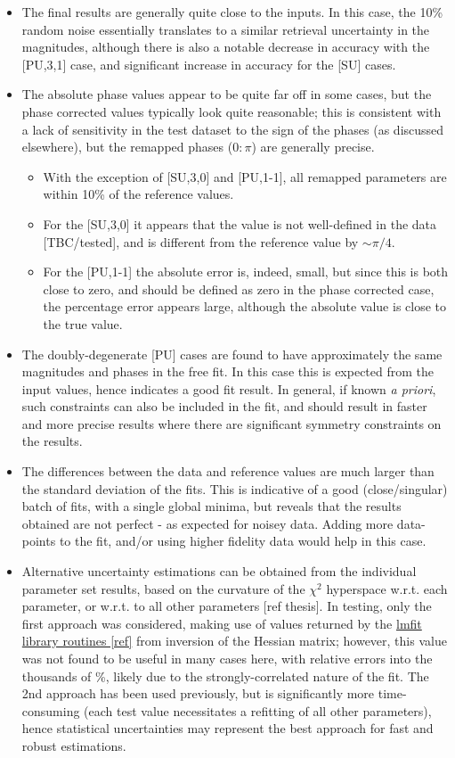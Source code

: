 \begin{itemize}
\item The final results are generally quite close to the inputs. In this case, the 10\% random noise essentially translates to a similar retrieval uncertainty in the magnitudes, although there is also a notable decrease in accuracy with the [PU,3,1] case, and significant increase in accuracy for the [SU] cases.
\item The absolute phase values appear to be quite far off in some cases, but the phase corrected values typically look quite reasonable; this is consistent with a lack of sensitivity in the test dataset to the sign of the phases (as discussed elsewhere), but the remapped phases ($0:\pi$) are generally precise. 
\begin{itemize}
\item With the exception of [SU,3,0] and [PU,1-1], all remapped parameters are within 10\% of the reference values.
\item For the [SU,3,0] it appears that the value is not well-defined in the data [TBC/tested], and is different from the reference value by $\sim\pi/4$.
\item For the [PU,1-1] the absolute error is, indeed, small, but since this is both close to zero, and should be defined as zero in the phase corrected case, the percentage error appears large, although the absolute value is close to the true value.
\end{itemize}
\item The doubly-degenerate [PU] cases are found to have approximately the same magnitudes and phases in the free fit. In this case this is expected from the input values, hence indicates a good fit result. In general, if known \textit{a priori}, such constraints can also be included in the fit, and should result in faster and more precise results where there are significant symmetry constraints on the results.
\item The differences between the data and reference values are much larger than the standard deviation of the fits. This is indicative of a good (close/singular) batch of fits, with a single global minima, but reveals that the results obtained are not perfect - as expected for noisey data. Adding more data-points to the fit, and/or using higher fidelity data would help in this case.
\item Alternative uncertainty estimations can be obtained from the individual parameter set results, based on the curvature of the $\chi^2$ hyperspace w.r.t. each parameter, or w.r.t. to all other parameters [ref thesis]. In testing, only the first approach was considered, making use of values returned by the \href{https://lmfit.github.io/lmfit-py/fitting.html#uncertainties-in-variable-parameters-and-their-correlations}{lmfit library routines [ref]} from inversion of the Hessian matrix; however, this value was not found to be useful in many cases here, with relative errors into the thousands of \%, likely due to the strongly-correlated nature of the fit. The 2nd approach has been used previously, but is significantly more time-consuming (each test value necessitates a refitting of all other parameters), hence statistical uncertainties may represent the best approach for fast and robust estimations.

\end{itemize}
